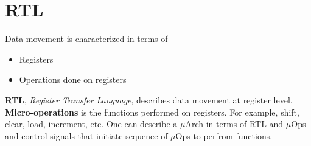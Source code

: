 \section{RTL}
Data movement is characterized in terms of
\begin{itemize}
    \item Registers
    \item Operations done on registers
\end{itemize}
\textbf{RTL}, \textit{Register Transfer Language}, describes data movement at register level.
\textbf{Micro-operations} is the functions performed on registers. For example, shift, clear, load, increment, etc.
One can describe a \(\mu\)Arch in terms of RTL and \(\mu\)Ops and control signals that initiate sequence of \(\mu\)Ops to perfrom functions.

